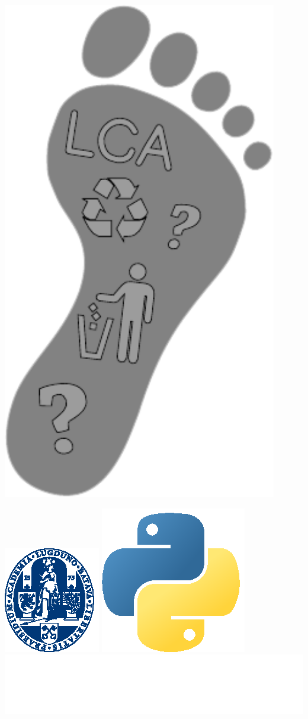 \documentclass[a0paper,fleqn]{betterposter}
\begin{document}
{{\begin{minipage}{0.5\textwidth}
\begin{flushleft}
            \includegraphics[width=0.9\textwidth]{img/foot.pdf}
        \end{flushleft}
        \vspace{100pt}
        \end{minipage}
        \includegraphics[height=0.1\textwidth]{img/logoUL_white}\hfill
        \includegraphics[height=0.07\textwidth]{img/python}\hfill
        \includegraphics[height=0.07\textwidth]{img/brightway}

}}
\end{document}
